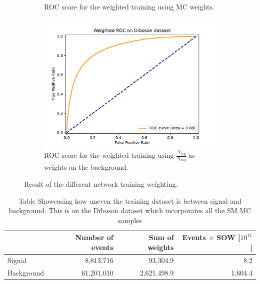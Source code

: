 \documentclass[14pt, a4paper]{book}
\begin{document}
\begin{figure}[!ht]
\begin{subfigure}[b]{0.49\textwidth}
        \caption{ROC score for the weighted training using MC weights.}\label{fig:DibosonROCMC}
     \end{subfigure}
     \begin{subfigure}[b]{0.49\textwidth}
        \centering
        \includegraphics[width=1\textwidth]{ROC_w.pdf}
        \caption{ROC score for the weighted training using $\frac{N_{sig}}{N_{bkg}}$ as weights on the background.}\label{fig:DibosonROCW}
     \end{subfigure}
	\caption{Result of the different network training weighting.}\label{fig:DibosonROC}
\end{figure}
\begin{table}[!h]
    \centering
    \begin{tabular}{l|r|r|r}\midrule\midrule
                    & Number of events & Sum of weights & Events $\times$ SOW [$10^{11}$]\\\midrule
         Signal     & 8,813,716        & 93,304.9       & 8.2\\
         Background & 61,201,010       & 2,621,498.9    & 1,604.4 \\ \midrule\midrule
    \end{tabular}
    \caption[Unbalanced Diboson training dataset]{Table Showcasing how uneven the training dataset is between signal and background. This is on the Diboson dataset which incorporates all the SM MC samples}
    \label{tab:UnbalancedDibosonTraining}
\end{table}

\clearpage
\end{document}
